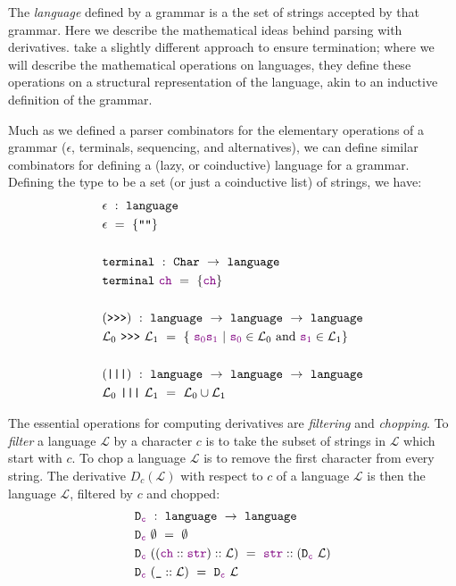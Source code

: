     The \emph{language} defined by a grammar is a the set of strings accepted by that grammar.  Here we describe the mathematical ideas behind parsing with derivatives.  \citeauthor*{Derivs} take a slightly different approach to ensure termination; where we will describe the mathematical operations on languages, they define these operations on a structural representation of the language, akin to an inductive definition of the grammar.
    
    Much as we defined a parser combinators for the elementary operations of a grammar ($\epsilon$, terminals, sequencing, and alternatives), we can define similar combinators for defining a (lazy, or coinductive) language for a grammar.  Defining the type  to be a set (or just a coinductive list) of strings, we have:
\begin{align*}
& \epsilon~:~\fname{language} \\
& \epsilon~=~\{\str{}\} \\ \\
& \fname{terminal}~:~\indname{Char}~\to~\fname{language} \\
& \fname{terminal}~\farg{ch}~=~\{\farg{ch}\} \\ \\
& (\fname{\sequencing})~:~\fname{language}~\to~\fname{language}~\to~\fname{language} \\
& \mathcal{L}_0~\fname{\sequencing}~\mathcal{L}_1~=~\{~\strcat{\farg{s\ensuremath{_0}}}{\farg{s\ensuremath{_1}}}~|~\farg{s\ensuremath{_0}}\in\mathcal L_0\text{ and }\farg{s\ensuremath{_1}}\in\mathcal{L}_1 \} \\ \\
& (\fname{|||})~:~\fname{language}~\to~\fname{language}~\to~\fname{language} \\
& \mathcal{L}_0~\fname{|||}~\mathcal{L}_1~=~\mathcal L_0\cup\mathcal L_1
\end{align*}

    The essential operations for computing derivatives are \emph{filtering} and \emph{chopping}.  To \emph{filter} a language $\mathcal L$ by a character $c$ is to take the subset of strings in $\mathcal L$ which start with $c$.  To chop a language $\mathcal L$ is to remove the first character from every string.  The derivative $D_c(\mathcal L)$ with respect to $c$ of a language $\mathcal L$ is then the language $\mathcal L$, filtered by $c$ and chopped:
\begin{align*}
&\texttt{D}_{\textcolor{violet}{\texttt{c}}}~:~\texttt{language}~\to~\texttt{language} \\
&\texttt{D}_{\textcolor{violet}{\texttt{c}}}~\emptyset~=~\emptyset \\
&\texttt{D}_{\textcolor{violet}{\texttt{c}}}~((\textcolor{violet}{\texttt{ch}}::\textcolor{violet}{\texttt{str}})::\mathcal L)~=~\textcolor{violet}{\texttt{str}}::(\texttt{D}_{\textcolor{violet}{\texttt{c}}}~\mathcal{L}) \\
&\texttt{D}_{\textcolor{violet}{\texttt{c}}}~(\texttt{\_}::\mathcal L)~=~\texttt{D}_{\textcolor{violet}{\texttt{c}}}~\mathcal{L}
\end{align*}

